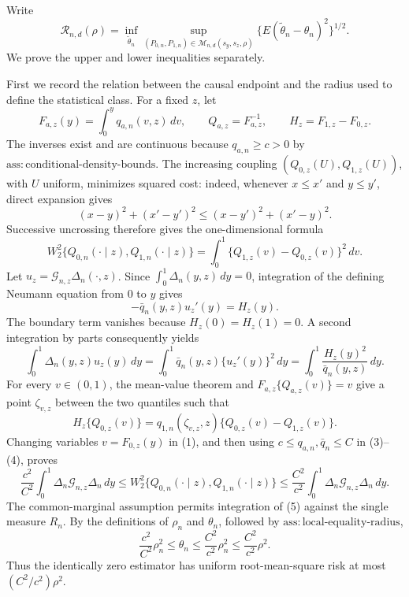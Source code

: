 Write
\[
\mathcal R_{n,d}(\rho)=
\inf_{\widetilde\theta_n}
\sup_{(P_{0,n},P_{1,n})\in\mathcal M_{n,d}(s_y,s_z,\rho)}
\{E(\widetilde\theta_n-\theta_n)^2\}^{1/2}.
\]
We prove the upper and lower inequalities separately.

First we record the relation between the causal endpoint and the radius used to define the statistical class.  For a fixed \(z\), let
\[
F_{a,z}(y)=\int_0^yq_{a,n}(v,z)\,dv,
\qquad Q_{a,z}=F_{a,z}^{-1},
\qquad H_z=F_{1,z}-F_{0,z}.
\]
The inverses exist and are continuous because
\(q_{a,n}\ge c>0\) by
\(\mathrm{ass{:}conditional\text{-}density\text{-}bounds}\).
The increasing coupling \((Q_{0,z}(U),Q_{1,z}(U))\), with \(U\) uniform, minimizes squared cost: indeed, whenever \(x\le x'\) and \(y\le y'\), direct expansion gives
\[
(x-y)^2+(x'-y')^2
\le (x-y')^2+(x'-y)^2.
\]
Successive uncrossing therefore gives the one-dimensional formula
\[
W_2^2\{Q_{0,n}(\cdot\mid z),Q_{1,n}(\cdot\mid z)\}
=\int_0^1\{Q_{1,z}(v)-Q_{0,z}(v)\}^2\,dv.                 \tag{1}
\]
Let \(u_z=\mathcal G_{n,z}\Delta_n(\cdot,z)\).  Since
\(\int_0^1\Delta_n(y,z)\,dy=0\), integration of the defining Neumann equation from \(0\) to \(y\) gives
\[
-\bar q_n(y,z)u_z'(y)=H_z(y).                              \tag{2}
\]
The boundary term vanishes because \(H_z(0)=H_z(1)=0\).  A second integration by parts consequently yields
\[
\int_0^1\Delta_n(y,z)u_z(y)\,dy
=\int_0^1\bar q_n(y,z)\{u_z'(y)\}^2\,dy
=\int_0^1\frac{H_z(y)^2}{\bar q_n(y,z)}\,dy.              \tag{3}
\]
For every \(v\in(0,1)\), the mean-value theorem and
\(F_{a,z}\{Q_{a,z}(v)\}=v\) give a point \(\zeta_{v,z}\) between the two quantiles such that
\[
H_z\{Q_{0,z}(v)\}
=q_{1,n}(\zeta_{v,z},z)\{Q_{0,z}(v)-Q_{1,z}(v)\}.          \tag{4}
\]
Changing variables \(v=F_{0,z}(y)\) in (1), and then using
\(c\le q_{a,n},\bar q_n\le C\) in (3)--(4), proves
\[
\frac{c^2}{C^2}
\int_0^1\Delta_n\mathcal G_{n,z}\Delta_n\,dy
\le W_2^2\{Q_{0,n}(\cdot\mid z),Q_{1,n}(\cdot\mid z)\}
\le
\frac{C^2}{c^2}
\int_0^1\Delta_n\mathcal G_{n,z}\Delta_n\,dy.            \tag{5}
\]
The common-marginal assumption permits integration of (5) against the single measure \(R_n\).  By the definitions of \(\rho_n\) and \(\theta_n\), followed by
\(\mathrm{ass{:}local\text{-}equality\text{-}radius}\),
\[
\frac{c^2}{C^2}\rho_n^2\le\theta_n
\le\frac{C^2}{c^2}\rho_n^2
\le\frac{C^2}{c^2}\rho^2.                                \tag{6}
\]
Thus the identically zero estimator has uniform root-mean-square risk at most \((C^2/c^2)\rho^2\).

